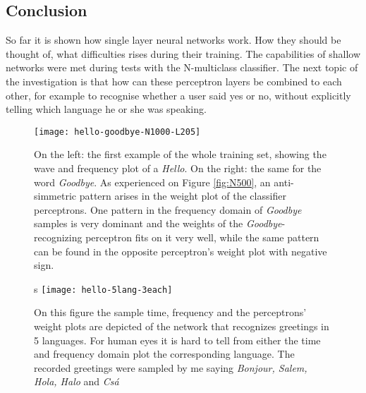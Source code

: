 \subsection{Conclusion}
So far it is shown how single layer neural networks work. How they should be thought of, what difficulties rises during their training. The capabilities of shallow networks were met during tests with the N-multiclass classifier. The next topic of the investigation is that how can these perceptron layers be combined to each other, for example to recognise whether a user said yes or no, without explicitly telling  which language he or she was speaking.

\begin{figure}
	\centering
	\texttt{[image: hello-goodbye-N1000-L205]}
	\caption{On the left: the first example of the whole training set, showing the wave and frequency plot of a \emph{Hello}. On the right: the same for the word \emph{Goodbye}. As experienced on Figure \ref{fig:N500}, an anti-simmetric pattern arises in the weight plot of the classifier perceptrons. One pattern in the frequency domain of \emph{Goodbye} samples is very dominant and the weights of the \emph{Goodbye}-recognizing perceptron fits on it very well, while the same pattern can be found in the opposite perceptron's weight plot with negative sign.}
	
	\label{fig:hello}
\end{figure}

\begin{figure}s
	\centering
	\texttt{[image: hello-5lang-3each]}
	\caption{On this figure the sample time, frequency and the perceptrons' weight plots are depicted of the network that recognizes greetings in 5 languages. For human eyes it is hard to tell from either the time and frequency domain plot the corresponding language. The recorded greetings were sampled by me saying \emph{Bonjour, Salem, Hola, Halo} and \emph{Csá}}
	
	\label{fig:hello5}
\end{figure}
